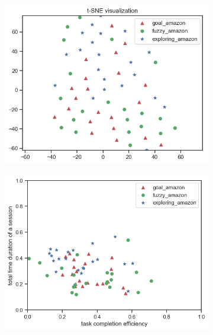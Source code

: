 \begin{figure}[H]
    \centering

    \begin{subfigure}[b]{0.45\textwidth}
        \includegraphics[width=1\textwidth]{figures/tsne-amazon}
        \caption{}
        \label{fig:tsne-amazon}
    \end{subfigure}
    \begin{subfigure}[b]{0.45\textwidth}
        \includegraphics[width=1\textwidth]{figures/2d-eff-dur-amazon}
        \caption{}
        \label{fig:2d-eff-dur-amazon}
    \end{subfigure}
    \begin{subfigure}[b]{0.45\textwidth}

\end{subfigure}
\end{figure}
